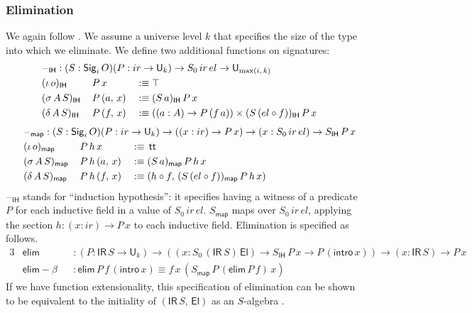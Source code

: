 \documentclass[acmsmall,screen,review,anonymous]{acmart}
\newcommand{\msf}[1]{{\mathsf{#1}}}
\newcommand{\U}{\msf{U}}
\newcommand{\El}{\msf{El}}
\newcommand{\Sig}{\msf{Sig}}
\newcommand{\ttt}{\msf{tt}}
\newcommand{\blank}{{\mathord{\hspace{1pt}\text{--}\hspace{1pt}}}}
\newcommand{\ir}{{ir}}
\newcommand{\el}{{el}}
\newcommand{\IR}{\msf{IR}}
\newcommand{\intro}{\msf{intro}}
\newcommand{\IH}{\msf{IH}}
\newcommand{\map}{\msf{map}}
\newcommand{\elim}{\msf{elim}}
\begin{document}
\subsubsection{Elimination}\label{sec:ir-elimination}

We again follow \citet{DBLP:journals/apal/DybjerS03}. We assume a universe level
$k$ that specifies the size of the type into which we eliminate. We define two additional functions
on signatures:
\begin{alignat*}{3}
  &\rlap{$\blank_\IH : (S : \Sig_i\,O)(P : \ir \to \U_k) \to S_0\,\ir\,\el \to \U_{\max(i,\,k)}$} \\
  &(\iota\,o)_\IH    \,&&P\,x       &&:\equiv \top \\
  &(\sigma\,A\,S)_\IH\,&&P\,(a,\,x) &&:\equiv (S\,a)_\IH\,P\,x \\
  &(\delta\,A\,S)_\IH\,&&P\,(f,\,x) &&:\equiv ((a : A) \to P\,(f\,a)) \times (S\,(\el \circ f))_\IH\,P\,x
\end{alignat*}
\begin{alignat*}{3}
  &\hspace{-7em}\rlap{$\blank_\map : (S : \Sig_i\,O)(P : \ir \to \U_k) \to ((x : \ir) \to P\,x) \to (x : S_0\,\ir\,\el) \to S_\IH\,P\,x$} \\
  &\hspace{-7em}(\iota\,o)_\map    \,&&P\,h\,x       &&:\equiv\,\ttt \\
  &\hspace{-7em}(\sigma\,A\,S)_\map\,&&P\,h\,(a,\,x) &&:\equiv (S\,a)_\map\,P\,h\,x \\
  &\hspace{-7em}(\delta\,A\,S)_\map\,&&P\,h\,(f,\,x) &&:\equiv (h \circ f,\,(S\,(\el \circ f))_\map\,P\,h\,x)
\end{alignat*}
$\blank_\IH$ stands for ``induction hypothesis'': it specifies having a witness of a predicate $P$ for
each inductive field in a value of $S_0\,\ir\,\el$. $S_\map$ maps over $S_0\,\ir\,\el$, applying the
section $h : (x : \ir) \to P\,x$ to each inductive field. Elimination is specified as follows.
\begin{alignat*}{3}
  &\elim           &&: (P : \IR\,S \to \U_k) \to ((x : S_0\,(\IR\,S)\,\El) \to S_\IH\,P\,x \to P\,(\intro\,x)) \to (x : \IR\,S) \to P\,x \\
  &\elim\!-\!\!\beta &&: \elim\,P\,f\,(\intro\,x) \equiv f\,x\,(S_\map\,P\,(\elim\,P\,f)\,x)
\end{alignat*}
If we have function extensionality, this specification of elimination can be shown to be equivalent
to the initiality of $(\IR\,S,\,\El)$ as an $S$-algebra \cite[Section~4.4]{DBLP:journals/apal/DybjerS03}.
\end{document}
